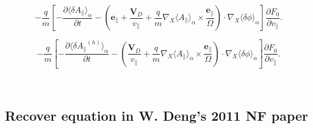 \documentclass{article}
\begin{document}
\[ - \frac{q}{m} \left[ - \frac{{\partial \langle \delta A_{\parallel}} 
   \rangle_{\alpha}}{\partial t} - \left( \mathbf{e}_{\parallel} +
   \frac{\mathbf{V}_D}{v_{\parallel}} + \frac{q}{m} \nabla_X \langle
   A_{\parallel} \rangle_{\alpha} \times \frac{\mathbf{e}_{\parallel}}{\Omega}
   \right) \cdot \nabla_X \langle \delta \phi \rangle_{\alpha} \right]
   \frac{\partial F_0}{\partial v_{\parallel}} . \]

\[ - \frac{q}{m} \left[ - \frac{{\partial \langle \delta A_{\parallel}} ^{(h)}
   \rangle_{\alpha}}{\partial t} - \left( \frac{\mathbf{V}_D}{v_{\parallel}} +
   \frac{q}{m} \nabla_X \langle A_{\parallel} \rangle_{\alpha} \times
   \frac{\mathbf{e}_{\parallel}}{\Omega} \right) \cdot \nabla_X \langle \delta
   \phi \rangle_{\alpha} \right] \frac{\partial F_0}{\partial v_{\parallel}} .
\]


\

\subsection{Recover equation in W. Deng's 2011 NF paper}
\end{document}
